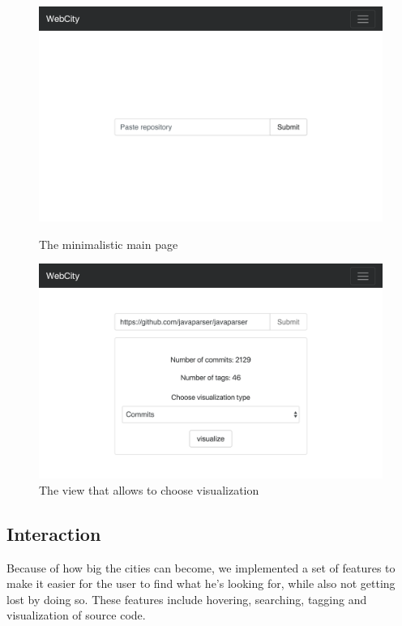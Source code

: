\documentclass[]{usiinfbachelorproject}
\begin{document}
\begin{figure}[H]
  \centering
  \begin{minipage}[b]{0.49\textwidth}
      \centering
      \includegraphics[width=1\textwidth]{pictures/interface.png}
      \caption{The minimalistic main page}
      \label{fig:interface}
  \end{minipage}
  \hfill
  \begin{minipage}[b]{0.49\textwidth}
      \centering
      \includegraphics[width=1\textwidth]{pictures/interface2.png}
      \caption{The view that allows to choose visualization}
      \label{fig:interface2}
  \end{minipage}
\end{figure}

\subsection{Interaction} \label{Interaction}
Because of how big the cities can become, we implemented a set of features to make it easier for the user to find what he's looking for, while also not getting lost by doing so. These features include hovering, searching, tagging and visualization of source code.
\end{document}
